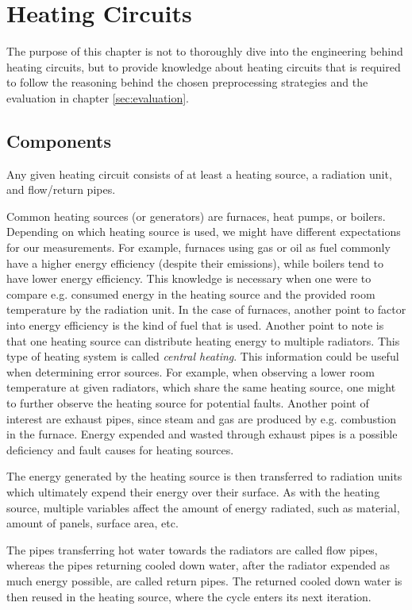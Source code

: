 \documentclass[bachelor,english]{info1thesis}
\begin{document}
\section{Heating Circuits}
\label{sec:heatingcircuits}
The purpose of this chapter is not to thoroughly dive into the engineering behind heating circuits, but to provide knowledge about heating circuits that is required to follow the reasoning behind the chosen preprocessing strategies and the evaluation in chapter \ref{sec:evaluation}.

\subsection{Components} 
\label{sec:components}

Any given heating circuit consists of at least a heating source, a radiation unit, and flow/return pipes.


Common heating sources (or generators) are furnaces, heat pumps, or boilers. Depending on which heating source is used, we might have different expectations for our measurements. For example, furnaces using gas or oil as fuel commonly have a higher energy efficiency (despite their emissions), while boilers tend to have lower energy efficiency. This knowledge is necessary when one were to compare e.g. consumed energy in the heating source and the provided room temperature by the radiation unit. In the case of furnaces, another point to factor into energy efficiency is the kind of fuel that is used. Another point to note is that one heating source can distribute heating energy to multiple radiators. This type of heating system is called \textit{central heating}. This information could be useful when determining error sources. For example, when observing a lower room temperature at given radiators, which share the same heating source, one might to further observe the heating source for potential faults.
Another point of interest are exhaust pipes, since steam and gas are produced by e.g. combustion in the furnace. Energy expended and wasted through exhaust pipes is a  possible deficiency and fault causes for heating sources.



The energy generated by the heating source is then transferred to radiation units which ultimately expend their energy over their surface. As with the heating source, multiple variables affect the amount of energy radiated, such as material, amount of panels, surface area, etc. 

The pipes transferring hot water towards the radiators are called flow pipes, whereas the pipes returning cooled down water, after the radiator expended as much energy possible, are called return pipes. The returned cooled down water is then reused in the heating source, where the cycle enters its next iteration.
\end{document}
